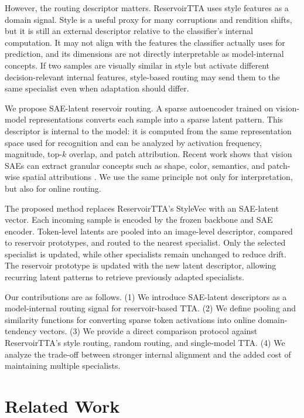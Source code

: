 \documentclass{article}
\begin{document}
However, the routing descriptor matters. ReservoirTTA uses style features as a domain signal. Style is a useful proxy for many corruptions and rendition shifts, but it is still an external descriptor relative to the classifier's internal computation. It may not align with the features the classifier actually uses for prediction, and its dimensions are not directly interpretable as model-internal concepts. If two samples are visually similar in style but activate different decision-relevant internal features, style-based routing may send them to the same specialist even when adaptation should differ.

We propose SAE-latent reservoir routing. A sparse autoencoder trained on vision-model representations converts each sample into a sparse latent pattern. This descriptor is internal to the model: it is computed from the same representation space used for recognition and can be analyzed by activation frequency, magnitude, top-$k$ overlap, and patch attribution. Recent work shows that vision SAEs can extract granular concepts such as shape, color, semantics, and patch-wise spatial attributions \cite{lim2025patchsae}. We use the same principle not only for interpretation, but also for online routing.

The proposed method replaces ReservoirTTA's StyleVec with an SAE-latent vector. Each incoming sample is encoded by the frozen backbone and SAE encoder. Token-level latents are pooled into an image-level descriptor, compared to reservoir prototypes, and routed to the nearest specialist. Only the selected specialist is updated, while other specialists remain unchanged to reduce drift. The reservoir prototype is updated with the new latent descriptor, allowing recurring latent patterns to retrieve previously adapted specialists.

Our contributions are as follows. (1) We introduce SAE-latent descriptors as a model-internal routing signal for reservoir-based TTA. (2) We define pooling and similarity functions for converting sparse token activations into online domain-tendency vectors. (3) We provide a direct comparison protocol against ReservoirTTA's style routing, random routing, and single-model TTA. (4) We analyze the trade-off between stronger internal alignment and the added cost of maintaining multiple specialists.

\section{Related Work}
\end{document}
